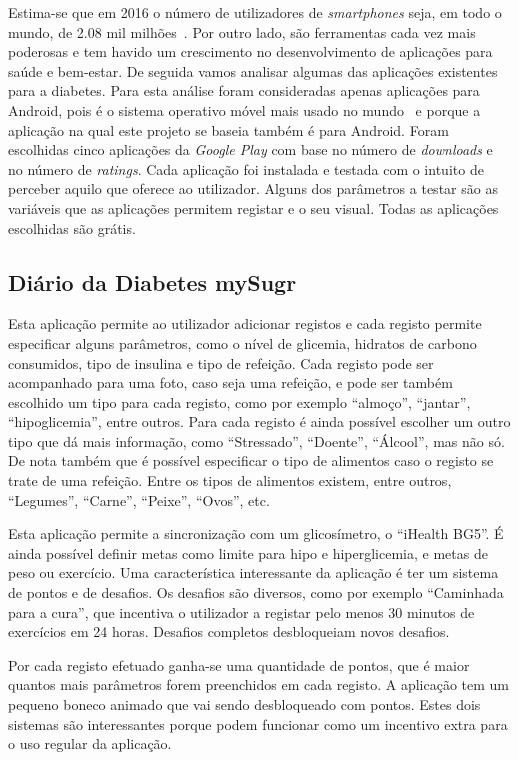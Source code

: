 Estima-se que em 2016 o número de utilizadores de \textit{smartphones} seja, em todo o mundo, de 2.08 mil milhões~\cite{users}.
Por outro lado, são ferramentas cada vez mais poderosas e tem havido um crescimento no desenvolvimento de aplicações para saúde e bem-estar. De seguida vamos analisar algumas das aplicações existentes para a diabetes. Para esta análise foram consideradas apenas aplicações para Android, pois é o sistema operativo móvel mais usado no mundo~\cite{mercadomovel} e porque a aplicação na qual este projeto se baseia também é para Android. Foram escolhidas cinco aplicações da \textit{Google Play} com base no número de \textit{downloads} e no número de \textit{ratings}. Cada aplicação foi instalada e testada com o intuito de perceber aquilo que oferece ao utilizador. Alguns dos parâmetros a testar são as variáveis que as aplicações permitem registar e o seu visual. Todas as aplicações escolhidas são grátis.

\subsection{Diário da Diabetes mySugr}

Esta aplicação permite ao utilizador adicionar registos e cada registo permite especificar alguns parâmetros, como o nível de glicemia, hidratos de carbono consumidos, tipo de insulina e tipo de refeição. Cada registo pode ser acompanhado para uma foto, caso seja uma refeição, e pode ser também escolhido um tipo para cada registo, como por exemplo ``almoço'', ``jantar'', ``hipoglicemia'', entre outros. Para cada registo é ainda possível escolher um outro tipo que dá mais informação, como ``Stressado'', ``Doente'', ``Álcool'', mas não só. De nota também que é possível especificar o tipo de alimentos caso o registo se trate de uma refeição. Entre os tipos de alimentos existem, entre outros, ``Legumes'', ``Carne'', ``Peixe'', ``Ovos'', etc.

Esta aplicação permite a sincronização com um glicosímetro, o ``iHealth BG5''. É ainda possível definir metas como limite para hipo e hiperglicemia, e metas de peso ou exercício. Uma característica interessante da aplicação é ter um sistema de pontos e de desafios. Os desafios são diversos, como por exemplo ``Caminhada para a cura'', que incentiva o utilizador a registar pelo menos 30 minutos de exercícios em 24 horas. Desafios completos desbloqueiam novos desafios. 

Por cada registo efetuado ganha-se uma quantidade de pontos, que é maior quantos mais parâmetros forem preenchidos em cada registo. A aplicação tem um pequeno boneco animado que vai sendo desbloqueado com pontos. Estes dois sistemas são interessantes porque podem funcionar como um incentivo extra para o uso regular da aplicação. 

